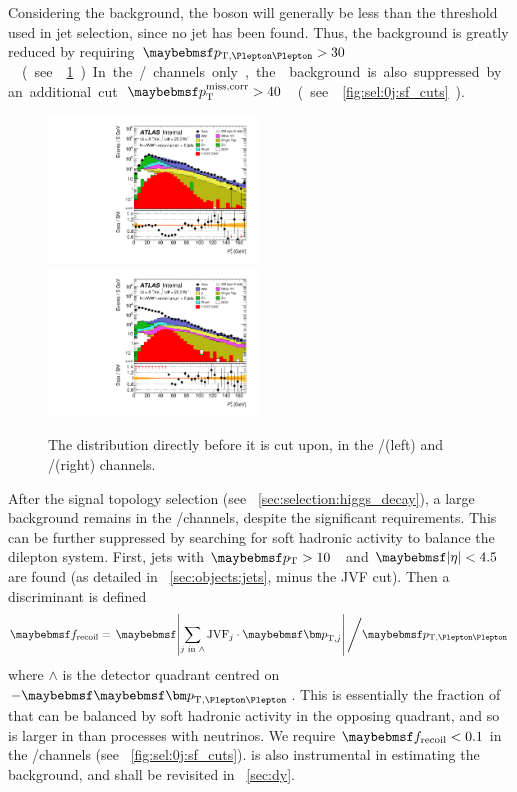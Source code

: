 Considering the \DYll background, the boson \pt will generally be less than the \pt 
threshold used in jet selection, since no jet has been found. Thus, the \DY background is 
greatly reduced by requiring \unit{$\ptll > 30$}{\GeV} (see 
\Figure~\ref{fig:sel:0j:ptll}). In the \eech/\mmch channels only, the \DYll background is 
also suppressed by an additional cut \unit{$\corrtrackmet > 40$}{\GeV} (see 
\Figure~\ref{fig:sel:0j:sf_cuts}).

\begin{figure}
	\includegraphics[width=0.495\textwidth]{tex/selection/emme_CutDPhillMET_0jet_Ptll_mh125_log}
	\hfill
	\includegraphics[width=0.495\textwidth]{tex/selection/eemm_CutDPhillMET_0jet_Ptll_mh125_log}
	\caption{The \ptll distribution directly before it is cut upon, in the \emch/\mech (left) 
	and \eech/\mmch (right) channels.}
	\label{fig:sel:0j:ptll}
\end{figure}

After the signal topology selection (see \Section~\ref{sec:selection:higgs_decay}), a 
large \DYll background remains in the \eech/\mmch channels, despite the significant \met 
requirements. This can be further suppressed by searching for soft hadronic activity to 
balance the dilepton system. First, jets with \unit{$\pt > 10$}{\GeV} and $\mods{\eta} < 
4.5$ are found (as detailed in \Section~\ref{sec:objects:jets}, minus the JVF cut). 
Then a discriminant is defined
\begin{equation}
	\frecoil = \left. \mods{\sum\limits_{j\text{ in }\wedge} \text{JVF}_{j} \cdot \bvec{p}_{\text{T,}j}} \, \middle/ \ptll \right.
	\label{eq:frecoil}
\end{equation}
where $\wedge$ is the detector quadrant centred on $-\ptllvec$. This is essentially the 
fraction of \ptll that can be balanced by soft hadronic activity in the opposing quadrant,
and so is larger in \DYll than processes with neutrinos. We require $\frecoil < 0.1$ in 
the \eech/\mmch channels (see \Figure~\ref{fig:sel:0j:sf_cuts}). \frecoil is also 
instrumental in estimating the \DYll background, and shall be revisited in 
\Section~\ref{sec:dy}.

